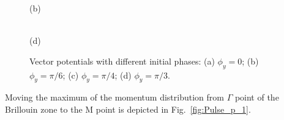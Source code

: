 \begin{figure}[h!]
\begin{minipage}[h]{0.5\linewidth}
\end{minipage}
\begin{minipage}[h]{0.5\linewidth}
 (b) \\
\end{minipage}
\hfill
\begin{minipage}[h]{0.5\linewidth}
 \\(d)
\end{minipage}
\caption{Vector potentials with different initial phases: (a) $\phi_y=0$; (b) $\phi_y=\pi /6$; (c) $\phi_y=\pi /4$; (d) $\phi_y=\pi /3$.}
\label{fig:Pulses_1}
\end{figure}

Moving the maximum of the momentum distribution from $\Gamma$ point of the Brillouin zone to the M point is depicted in Fig.~\ref{fig:Pulse_p_1}. 

